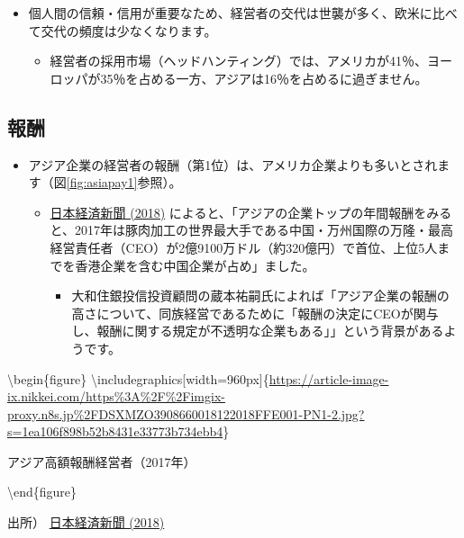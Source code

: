 \documentclass[
]{book}
\providecommand{\tightlist}{%
  \setlength{\itemsep}{0pt}\setlength{\parskip}{0pt}}
\begin{document}
\begin{itemize}
\item
  個人間の信頼・信用が重要なため、経営者の交代は世襲が多く、欧米に比べて交代の頻度は少なくなります。

  \begin{itemize}
  \tightlist
  \item
    経営者の採用市場（ヘッドハンティング）では、アメリカが41％、ヨーロッパが35％を占める一方、アジアは16％を占めるに過ぎません。
  \end{itemize}
\end{itemize}

\hypertarget{asia-payment}{%
\subsection{報酬}\label{asia-payment}}

\begin{itemize}
\item
  アジア企業の経営者の報酬（第1位）は、アメリカ企業よりも多いとされます（図\ref{fig:asiapay1}参照）。

  \begin{itemize}
  \item
    \href{https://www.nikkei.com/article/DGXMZO39094070Y8A211C1FFE000/}{日本経済新聞 (2018)} によると、「アジアの企業トップの年間報酬をみると、2017年は豚肉加工の世界最大手である中国・万州国際の万隆・最高経営責任者（CEO）が2億9100万ドル（約320億円）で首位、上位5人までを香港企業を含む中国企業が占め」ました。

    \begin{itemize}
    \tightlist
    \item
      大和住銀投信投資顧問の蔵本祐嗣氏によれば「アジア企業の報酬の高さについて、同族経営であるために「報酬の決定にCEOが関与し、報酬に関する規定が不透明な企業もある」」という背景があるようです。
    \end{itemize}
  \end{itemize}
\end{itemize}

\textbackslash begin\{figure\}
\textbackslash includegraphics{[}width=960px{]}\{\url{https://article-image-ix.nikkei.com/https\%3A\%2F\%2Fimgix-proxy.n8s.jp\%2FDSXMZO3908660018122018FFE001-PN1-2.jpg?s=1ea106f898b52b8431e33773b734ebb4}\}

\caption{アジア高額報酬経営者（2017年）}

\label{fig:asiapay1}
\textbackslash end\{figure\}

出所） \href{https://www.nikkei.com/article/DGXMZO39094070Y8A211C1FFE000/}{日本経済新聞 (2018)}
\end{document}
